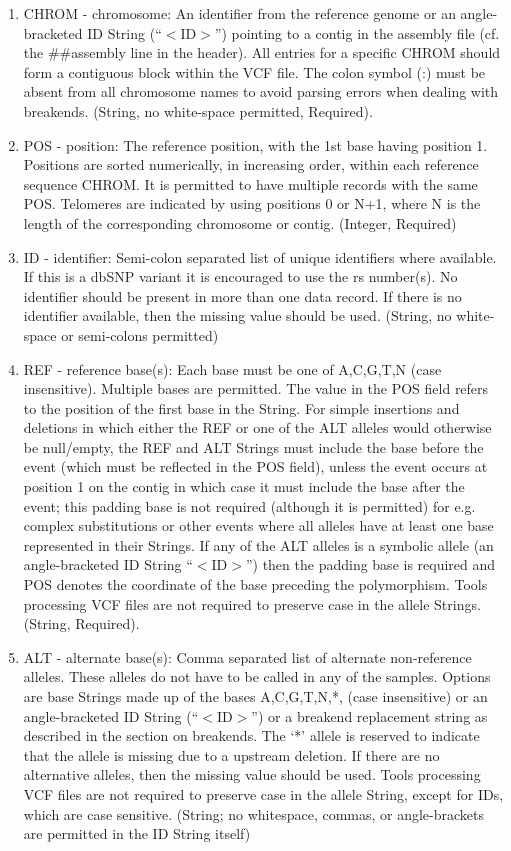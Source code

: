 \documentclass[8pt]{article}
\begin{document}
\begin{enumerate}
  \item CHROM - chromosome: An identifier from the reference genome or an angle-bracketed ID String (``$<$ID$>$'') pointing to a contig in the assembly file (cf. the \#\#assembly line in the header). All entries for a specific CHROM should form a contiguous block within the VCF file. The colon symbol (:) must be absent from all chromosome names to avoid parsing errors when dealing with breakends. (String, no white-space permitted, Required).
  \item POS - position: The reference position, with the 1st base having position 1. Positions are sorted numerically, in increasing order, within each reference sequence CHROM.   It is permitted to have multiple records with the same POS. Telomeres are indicated by using positions 0 or N+1, where N is the length of the corresponding chromosome or contig.   (Integer, Required)
  \item ID - identifier: Semi-colon separated list of unique identifiers where available. If this is a dbSNP variant it is encouraged to use the rs number(s). No identifier should be present in more than one data record. If there is no identifier available, then the missing value should be used. (String, no white-space or semi-colons permitted)
  \item REF - reference base(s): Each base must be one of A,C,G,T,N (case insensitive). Multiple bases are permitted. The value in the POS field refers to the position of the first base in the String. For simple insertions and deletions in which either the REF or one of the ALT alleles would otherwise be null/empty, the REF and ALT Strings must include the base before the event (which must be reflected in the POS field), unless the event occurs at position 1 on the contig in which case it must include the base after the event; this padding base is not required (although it is permitted) for e.g. complex substitutions or other events where all alleles have at least one base represented in their Strings.  If any of the ALT alleles is a symbolic allele (an angle-bracketed ID String ``$<$ID$>$'') then the padding base is required and POS denotes the coordinate of the base preceding the polymorphism. Tools processing VCF files are not required to preserve case in the allele Strings. (String, Required).
  \item ALT - alternate base(s): Comma separated list of alternate non-reference alleles.  These alleles do not have to be called in any of the samples. Options are base Strings made up of the bases A,C,G,T,N,*, (case insensitive) or an angle-bracketed ID String (``$<$ID$>$'') or a breakend replacement string as described in the section on breakends. The `*' allele is reserved to indicate that the allele is missing due to a upstream deletion. If there are no alternative alleles, then the missing value should be used.  Tools processing VCF files are not required to preserve case in the allele String, except for IDs, which are case sensitive.  (String; no whitespace, commas, or angle-brackets are permitted in the ID String itself)

\end{enumerate}
\end{document}
